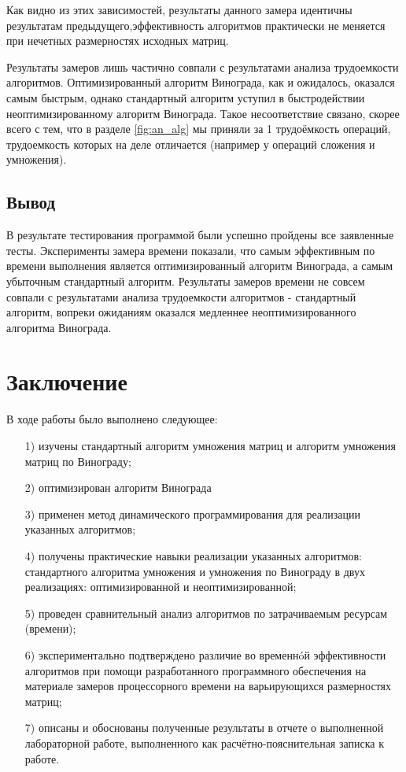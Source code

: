 \documentclass[a4paper,12pt]{article}
\begin{document}
        Как видно из этих зависимостей, результаты данного замера идентичны результатам предыдущего,эффективность алгоритмов практически не меняется при нечетных размерностях исходных матриц.
        
        Результаты замеров лишь частично совпали с результатами анализа трудоемкости алгоритмов. Оптимизированный алгоритм Винограда, как и ожидалось, оказался самым быстрым, однако стандартный алгоритм уступил в быстродействии неоптимизированному алгоритм Винограда. Такое несоответствие связано, скорее всего с тем, что в разделе \ref{fig:an_alg} мы приняли за 1 трудоёмкость операций, трудоемкость которых на деле отличается (например у операций сложения и умножения).
        
       \subsection*{Вывод}
       В результате тестирования программой были успешно пройдены все заявленные тесты. Эксперименты замера времени показали, что самым эффективным по времени выполнения является оптимизированный алгоритм Винограда, а самым убыточным стандартный алгоритм. Результаты замеров времени не совсем совпали с результатами анализа трудоемкости алгоритмов - стандартный алгоритм, вопреки ожиданиям оказался медленнее неоптимизированного алгоритма Винограда. 
        
    

\pagebreak
\section*{Заключение}
	В ходе работы было выполнено следующее:
	\begin{enumerate}
	
	\item[1)] 
	изучены стандартный алгоритм умножения матриц и алгоритм умножения матриц по Винограду;
	\item[2)] оптимизирован алгоритм Винограда
	\item[3)] применен метод динамического программирования для	реализации указанных
	алгоритмов;
	\item[4)] получены практические навыки реализации указанных алгоритмов: стандартного алгоритма умножения и умножения по Винограду в двух реализациях: оптимизированной и неоптимизированной;
	\item[5)] проведен сравнительный анализ алгоритмов по затрачиваемым ресурсам (времени);
	\item[6)] экспериментально подтверждено различие во временнóй эффективности алгоритмов при помощи разработанного программного обеспечения на материале замеров	процессорного времени на варьирующихся размерностях матриц;
	\item[7)] описаны и обоснованы полученные результаты в отчете о выполненной
	лабораторной
	работе, выполненного как расчётно-пояснительная записка к работе. 
	\end{enumerate}
	
\end{document}
